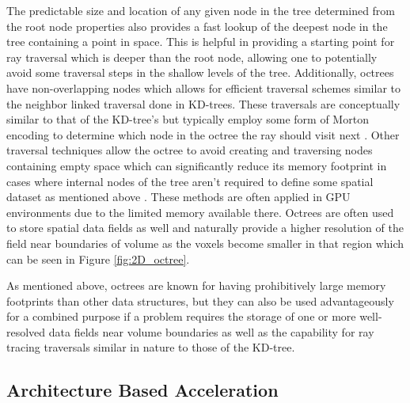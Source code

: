 The predictable size and location of any given node in the tree determined from
the root node properties also provides a fast lookup of the deepest node in the
tree containing a point in space. This is helpful in providing a starting point
for ray traversal which is deeper than the root node, allowing one to potentially avoid some traversal steps in the shallow levels of the tree. Additionally, octrees have non-overlapping nodes which allows
for efficient traversal schemes similar to the neighbor linked traversal done in
KD-trees. These traversals are conceptually similar to that of the KD-tree's but
typically employ some form of Morton encoding to determine which node in the
octree the ray should visit next \cite{Revelles_2000}. Other traversal
techniques allow the octree to avoid creating and traversing nodes containing
empty space which can significantly reduce its memory footprint in cases where
internal nodes of the tree aren't required to define some spatial dataset as
mentioned above \cite{Samet_1989}. These methods are often applied in GPU
environments due to the limited memory available there. Octrees are often used
to store spatial data fields as well and naturally provide a higher resolution of the field
near boundaries of volume as the voxels become smaller in that
region which can be seen in Figure \ref{fig:2D_octree}.

As mentioned above, octrees are known for having prohibitively large memory
footprints than other data structures, but they can also be used advantageously
for a combined purpose if a problem requires the storage of one or more
well-resolved data fields near volume boundaries as well as the capability for
ray tracing traversals similar in nature to those of the KD-tree.

\subsection{Architecture Based Acceleration}%
\label{subsec:arch}


